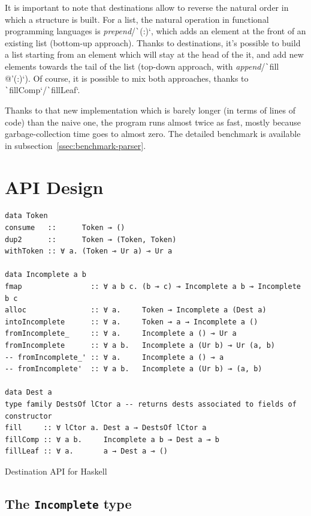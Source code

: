\documentclass[english]{jflart}
\begin{document}
It is important to note that destinations allow to reverse the natural order in which a structure is built. For a list, the natural operation in functional programming languages is \emph{prepend}/\texttt`(:)`, which adds an element at the front of an existing list (bottom-up approach). Thanks to destinations, it's possible to build a list starting from an element which will stay at the head of the it, and add new elements towards the tail of the list (top-down approach, with \emph{append}/\texttt`fill @'(:)`). Of course, it is possible to mix both approaches, thanks to \texttt`fillComp`/\texttt`fillLeaf`.

Thanks to that new implementation which is barely longer (in terms of lines of code) than the naive one, the program runs almost twice as fast, mostly because garbage-collection time goes to almost zero. The detailed benchmark is available in subsection~\ref{ssec:benchmark-parser}.


\section{API Design}\label{sec:api}

\begin{table}[t]
\small
\begin{verbatim}
data Token
consume   ::      Token ⊸ ()
dup2      ::      Token ⊸ (Token, Token)
withToken :: ∀ a. (Token ⊸ Ur a) ⊸ Ur a

data Incomplete a b
fmap                :: ∀ a b c. (b ⊸ c) ⊸ Incomplete a b ⊸ Incomplete b c
alloc               :: ∀ a.     Token ⊸ Incomplete a (Dest a)
intoIncomplete      :: ∀ a.     Token ⊸ a → Incomplete a ()
fromIncomplete_     :: ∀ a.     Incomplete a () ⊸ Ur a
fromIncomplete      :: ∀ a b.   Incomplete a (Ur b) ⊸ Ur (a, b)
-- fromIncomplete_' :: ∀ a.     Incomplete a () ⊸ a
-- fromIncomplete'  :: ∀ a b.   Incomplete a (Ur b) ⊸ (a, b)

data Dest a
type family DestsOf lCtor a -- returns dests associated to fields of constructor
fill     :: ∀ lCtor a. Dest a → DestsOf lCtor a
fillComp :: ∀ a b.     Incomplete a b ⊸ Dest a ⊸ b
fillLeaf :: ∀ a.       a → Dest a ⊸ ()
\end{verbatim}
\caption{Destination API for Haskell}
\label{table:destination-api}
\end{table}

\subsection{The \texttt{Incomplete} type}
\end{document}

